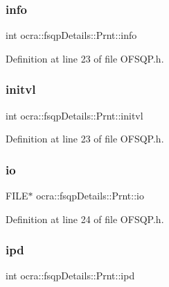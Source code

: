 \subsubsection{\texorpdfstring{info}{info}}
{\footnotesize\ttfamily int ocra\+::fsqp\+Details\+::\+Prnt\+::info}



Definition at line 23 of file O\+F\+S\+Q\+P.\+h.

\hypertarget{structocra_1_1fsqpDetails_1_1Prnt_a040dc7b88b4f54f32fd662b40af9e1f4}{}\label{structocra_1_1fsqpDetails_1_1Prnt_a040dc7b88b4f54f32fd662b40af9e1f4} 
\subsubsection{\texorpdfstring{initvl}{initvl}}
{\footnotesize\ttfamily int ocra\+::fsqp\+Details\+::\+Prnt\+::initvl}



Definition at line 23 of file O\+F\+S\+Q\+P.\+h.

\hypertarget{structocra_1_1fsqpDetails_1_1Prnt_a558896e07301f884eac55e411c6bfbd1}{}\label{structocra_1_1fsqpDetails_1_1Prnt_a558896e07301f884eac55e411c6bfbd1} 
\subsubsection{\texorpdfstring{io}{io}}
{\footnotesize\ttfamily F\+I\+LE$\ast$ ocra\+::fsqp\+Details\+::\+Prnt\+::io}



Definition at line 24 of file O\+F\+S\+Q\+P.\+h.

\hypertarget{structocra_1_1fsqpDetails_1_1Prnt_a00e8213f2ec3c624907394b01ef7c171}{}\label{structocra_1_1fsqpDetails_1_1Prnt_a00e8213f2ec3c624907394b01ef7c171} 
\subsubsection{\texorpdfstring{ipd}{ipd}}
{\footnotesize\ttfamily int ocra\+::fsqp\+Details\+::\+Prnt\+::ipd}



